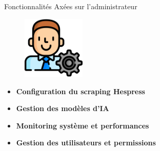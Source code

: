 \begin{frame}{Fonctionnalités Axées sur l'administrateur}
    \begin{figure}[H]
        \centering
        \includegraphics[height=3cm]{assets/images/admin.png}
    \end{figure}

    \begin{itemize}
        \setlength\itemsep{0.8em} %
        \item \textbf{Configuration du scraping Hespress}
        \item \textbf{Gestion des modèles d'IA}
        \item \textbf{Monitoring système et performances}
        \item \textbf{Gestion des utilisateurs et permissions}
    \end{itemize}
\end{frame}
